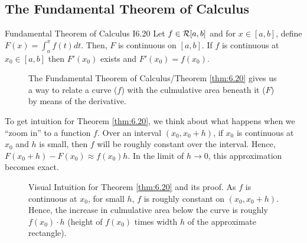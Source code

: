 \subsection{The Fundamental Theorem of Calculus}

\begin{theorem}{Fundamental Theorem of Calculus I}{6.20}
    Let $f \in \mathcal{R}[a, b]$ and for $x \in [a, b]$, define $F(x) = \int_a^x f(t)dt$. Then, $F$ is continuous on $[a, b]$. If $f$ is continuous at $x_0 \in [a, b]$ then $F'(x_0)$ exists and $F'(x_0) = f(x_0)$.  
\end{theorem}
\begin{figure}[htbp]
    \centering
    
    \caption{The Fundamental Theorem of Calculus/Theorem \ref{thm:6.20} gives us a way to relate a curve ($f$) with the culmulative area beneath it ($F$) by means of the derivative.}
    \label{fig35}
\end{figure}

To get intuition for Theorem \ref{thm:6.20}, we think about what happens when we ``zoom in'' to a function $f$. Over an interval $(x_0, x_0 + h)$, if $x_0$ is continuous at $x_0$ and $h$ is small, then $f$ will be roughly constant over the interval. Hence, $F(x_0 + h) - F(x_0) \approx f(x_0)h$. In the limit of $h \rightarrow 0$, this approximation becomes exact. 

\begin{figure}[htbp]
    \centering
    
    \caption{Visual Intuition for Theorem \ref{thm:6.20} and its proof. As $f$ is continuous at $x_0$, for small $h$, $f$ is roughly constant on $(x_0, x_0 + h)$. Hence, the increase in culmulative area below the curve is roughly $f(x_0)\cdot h$ (height of $f(x_0)$ times width $h$ of the approximate rectangle).}
    \label{fig36}
\end{figure}

